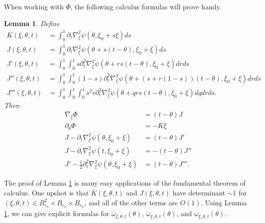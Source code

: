 \documentclass[12pt]{amsart}
\numberwithin{equation}{section}
\newtheorem{lemma}{Lemma}[section]
\newcommand{\1}{\mathbbm{1}}
\newcommand{\xixi}{\xi_0 + \xi}
\newcommand{\Bphi}{B_{\epsilon_\phi}}
\begin{document}
When working with $\Phi$, the following calculus formulas will prove handy. 
\begin{lemma}\label{lem: calc formulae}
    Define
        \begin{align}
            K(\xi,\theta, t) &= \int_0^1 \partial_t \nabla_\xi^2 \psi(\theta, \xi_0 + s \xi) ds \\
            J(\xi,\theta,t) &= \int_0^1 \partial_t \nabla_\xi^2 \psi(\theta + s(t - \theta), \xixi) ds \\
            J'(\xi,\theta,t) &= \int_0^1 \int_0^1 s \partial_t^2 \nabla_\xi^2 \psi(\theta + rs(t-\theta), \xixi) dr ds \\
            J''(\xi,\theta,t) &= \int_0^1 \int_0^1 (1-s) \partial_t^2 \nabla_\xi^2 \psi(\theta + (s + r(1-s))(t-\theta), \xixi) dr ds \\
            J'''(\xi,\theta,t) &= \int_0^1 \int_0^1 \int_0^1 s^2 r \partial_t^3 \nabla_\xi^2 \psi(\theta + qrs(t-\theta),\xixi) dq dr ds. 
        \end{align}
        Then 
        \begin{align}
            \nabla_\xi \Phi &= (t - \theta) J \\
            \partial_\theta \Phi &= -K \xi \\
            J - \partial_t \nabla_\xi^2 \psi(\theta, \xixi) &= (t - \theta)J' \label{eq: J to J' identity}\\
            J - \partial_t \nabla_\xi^2 \psi(t, \xixi) &= -(t-\theta) J'' \label{eq: J to J'' identity}\\
            J' - \frac{1}{2}\partial_t^2 \nabla_\xi^2 \psi(\theta, \xixi) &= (t-\theta) J''' \label{eq: J' to J''' identity}. 
        \end{align}
\end{lemma}

The proof of Lemma \ref{lem: calc formulae} is many easy applications of the fundamental theorem of calculus. One upshot is that $K(\xi, \theta, t)$ and $J(\xi, \theta, t)$ have determinant $\sim 1$ for $(\xi,\theta, t) \in \Bphi^2 \times \Bphi \times \Bphi$, and all of the other terms are $O(1)$. 
Using Lemma \ref{lem: calc formulae}, we can give explicit formulas for $\dot \omega_{\xi, \theta, t}(\theta)$, $\ddot \omega_{\xi, \theta, t}(\theta)$, and $\dddot \omega_{\xi, \theta, t}(\theta)$. 
\end{document}
